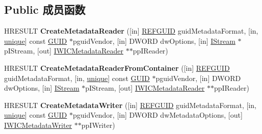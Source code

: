 \subsection*{Public 成员函数}
\begin{DoxyCompactItemize}
\item 
\mbox{\label{interface_i_w_i_c_component_factory_a1d573ad5891fc5d578eea9e32cbf31b1}} 
H\+R\+E\+S\+U\+LT {\bfseries Create\+Metadata\+Reader} (\mbox{[}in\mbox{]} \hyperlink{struct___g_u_i_d}{R\+E\+F\+G\+U\+ID} guid\+Metadata\+Format, \mbox{[}in, \hyperlink{interfaceunique}{unique}\mbox{]} const \hyperlink{interface_g_u_i_d}{G\+U\+ID} $\ast$pguid\+Vendor, \mbox{[}in\mbox{]} D\+W\+O\+RD dw\+Options, \mbox{[}in\mbox{]} \hyperlink{interface_i_stream}{I\+Stream} $\ast$p\+I\+Stream, \mbox{[}out\mbox{]} \hyperlink{interface_i_w_i_c_metadata_reader}{I\+W\+I\+C\+Metadata\+Reader} $\ast$$\ast$pp\+I\+Reader)
\item 
\mbox{\label{interface_i_w_i_c_component_factory_a459ec02b2b56046e28ef739981cafeb5}} 
H\+R\+E\+S\+U\+LT {\bfseries Create\+Metadata\+Reader\+From\+Container} (\mbox{[}in\mbox{]} \hyperlink{struct___g_u_i_d}{R\+E\+F\+G\+U\+ID} guid\+Metadata\+Format, \mbox{[}in, \hyperlink{interfaceunique}{unique}\mbox{]} const \hyperlink{interface_g_u_i_d}{G\+U\+ID} $\ast$pguid\+Vendor, \mbox{[}in\mbox{]} D\+W\+O\+RD dw\+Options, \mbox{[}in\mbox{]} \hyperlink{interface_i_stream}{I\+Stream} $\ast$p\+I\+Stream, \mbox{[}out\mbox{]} \hyperlink{interface_i_w_i_c_metadata_reader}{I\+W\+I\+C\+Metadata\+Reader} $\ast$$\ast$pp\+I\+Reader)
\item 
\mbox{\label{interface_i_w_i_c_component_factory_a62ece78d1f4bc51e4cfd742e5dbc5c59}} 
H\+R\+E\+S\+U\+LT {\bfseries Create\+Metadata\+Writer} (\mbox{[}in\mbox{]} \hyperlink{struct___g_u_i_d}{R\+E\+F\+G\+U\+ID} guid\+Metadata\+Format, \mbox{[}in, \hyperlink{interfaceunique}{unique}\mbox{]} const \hyperlink{interface_g_u_i_d}{G\+U\+ID} $\ast$pguid\+Vendor, \mbox{[}in\mbox{]} D\+W\+O\+RD dw\+Metadata\+Options, \mbox{[}out\mbox{]} \hyperlink{interface_i_w_i_c_metadata_writer}{I\+W\+I\+C\+Metadata\+Writer} $\ast$$\ast$pp\+I\+Writer)
\item 
\mbox{\label{interface_i_w_i_c_component_factory_af2eeb79ea42eed559fb155ba03b3689b}} 
$$
\end{DoxyCompactItemize}
